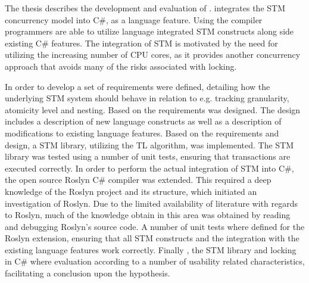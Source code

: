 \makeatletter {}\makeatother
{}

The thesis describes the development and evaluation of \stmname. \stmname  integrates the \ac{STM} concurrency model into C\#, as a language feature. Using the \stmname compiler programmers are able to utilize language integrated \ac{STM} constructs along side existing C\# features. The integration of \ac{STM} is motivated by the need for utilizing the increasing number of CPU cores, as it provides another concurrency approach that avoids many of the risks associated with locking.

In order to develop \stmname a set of requirements were defined, detailing how the underlying \ac{STM} system should behave in relation to e.g. tracking granularity, atomicity level and nesting. Based on the requirements \stmname was designed. The design includes a description of new language constructs as well as a description of modifications to existing language features. Based on the requirements and design, a \ac{STM} library, utilizing the TL algorithm, was implemented. The \ac{STM} library was tested using a number of unit tests, ensuring that transactions are executed correctly. In order to perform the actual integration of \ac{STM} into C\#, the open source Roslyn C\# compiler was extended. This required a deep knowledge of the Roslyn project and its structure, which initiated an investigation of Roslyn. Due to the limited availability of literature with regards to Roslyn, much of the knowledge obtain in this area was obtained by reading and debugging Roslyn's source code. A number of unit tests where defined for the Roslyn extension, ensuring that all \ac{STM} constructs and the integration with the existing language features work correctly. Finally \stmname, the \ac{STM} library and locking in C\# where evaluation according to a number of usability related characteristics, facilitating a conclusion upon the hypothesis.


